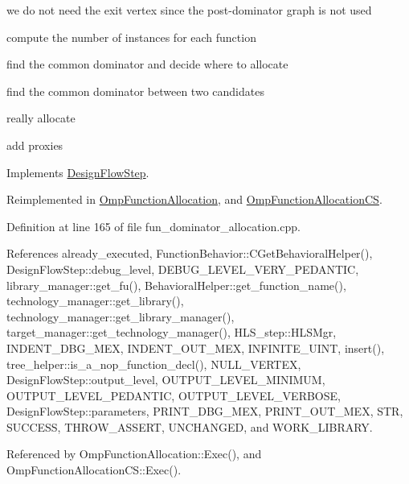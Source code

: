 we do not need the exit vertex since the post-\/dominator graph is not used

compute the number of instances for each function

find the common dominator and decide where to allocate

find the common dominator between two candidates

really allocate

add proxies 

Implements \hyperlink{classDesignFlowStep_a77d7e38493016766098711ea24f60b89}{Design\+Flow\+Step}.



Reimplemented in \hyperlink{classOmpFunctionAllocation_a5ed037b259e632de3cad930b2b5cc8ef}{Omp\+Function\+Allocation}, and \hyperlink{classOmpFunctionAllocationCS_a2a5a5321bfaefebcca2c4f290bb0d808}{Omp\+Function\+Allocation\+CS}.



Definition at line 165 of file fun\+\_\+dominator\+\_\+allocation.\+cpp.



References already\+\_\+executed, Function\+Behavior\+::\+C\+Get\+Behavioral\+Helper(), Design\+Flow\+Step\+::debug\+\_\+level, D\+E\+B\+U\+G\+\_\+\+L\+E\+V\+E\+L\+\_\+\+V\+E\+R\+Y\+\_\+\+P\+E\+D\+A\+N\+T\+IC, library\+\_\+manager\+::get\+\_\+fu(), Behavioral\+Helper\+::get\+\_\+function\+\_\+name(), technology\+\_\+manager\+::get\+\_\+library(), technology\+\_\+manager\+::get\+\_\+library\+\_\+manager(), target\+\_\+manager\+::get\+\_\+technology\+\_\+manager(), H\+L\+S\+\_\+step\+::\+H\+L\+S\+Mgr, I\+N\+D\+E\+N\+T\+\_\+\+D\+B\+G\+\_\+\+M\+EX, I\+N\+D\+E\+N\+T\+\_\+\+O\+U\+T\+\_\+\+M\+EX, I\+N\+F\+I\+N\+I\+T\+E\+\_\+\+U\+I\+NT, insert(), tree\+\_\+helper\+::is\+\_\+a\+\_\+nop\+\_\+function\+\_\+decl(), N\+U\+L\+L\+\_\+\+V\+E\+R\+T\+EX, Design\+Flow\+Step\+::output\+\_\+level, O\+U\+T\+P\+U\+T\+\_\+\+L\+E\+V\+E\+L\+\_\+\+M\+I\+N\+I\+M\+UM, O\+U\+T\+P\+U\+T\+\_\+\+L\+E\+V\+E\+L\+\_\+\+P\+E\+D\+A\+N\+T\+IC, O\+U\+T\+P\+U\+T\+\_\+\+L\+E\+V\+E\+L\+\_\+\+V\+E\+R\+B\+O\+SE, Design\+Flow\+Step\+::parameters, P\+R\+I\+N\+T\+\_\+\+D\+B\+G\+\_\+\+M\+EX, P\+R\+I\+N\+T\+\_\+\+O\+U\+T\+\_\+\+M\+EX, S\+TR, S\+U\+C\+C\+E\+SS, T\+H\+R\+O\+W\+\_\+\+A\+S\+S\+E\+RT, U\+N\+C\+H\+A\+N\+G\+ED, and W\+O\+R\+K\+\_\+\+L\+I\+B\+R\+A\+RY.



Referenced by Omp\+Function\+Allocation\+::\+Exec(), and Omp\+Function\+Allocation\+C\+S\+::\+Exec().

